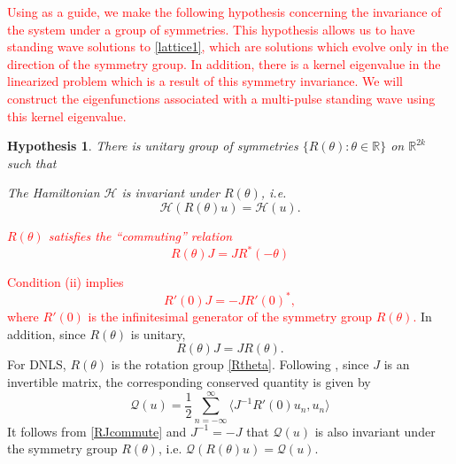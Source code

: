 \documentclass[12pt]{elsarticle}
\def\R{{\mathbb R}}
\newtheorem{hypothesis}{Hypothesis}
\newcommand{\revised}[1]{ \textcolor{red}{#1} }
\begin{document}
\revised{Using \cite{Grillakis1987} as a guide, we make the following hypothesis concerning the invariance of the system under a group of symmetries. This hypothesis allows us to have standing wave solutions to \eqref{lattice1}, which are solutions which evolve only in the direction of the symmetry group. In addition, there is a kernel eigenvalue in the linearized problem which is a result of this symmetry invariance. We will construct the eigenfunctions associated with a multi-pulse standing wave using this kernel eigenvalue.}
\begin{hypothesis}\label{symmetryhyp}
There is unitary group of symmetries $\{ R(\theta) : \theta \in \R \}$ on $\R^{2k}$ such that 
\begin{enumerate}[(i)]
\item The Hamiltonian $\mathcal{H}$ is invariant under $R(\theta)$, i.e. 
\begin{equation}\label{Hinvariance}
\mathcal{H}(R(\theta)u) = \mathcal{H}(u).
\end{equation}

\revised{
\item $R(\theta)$ satisfies the ``commuting'' relation
\begin{equation}\label{RJcommute}
R(\theta) J = J R^*(-\theta)
\end{equation}
}
\end{enumerate}
\end{hypothesis}
\revised{
\noindent Condition (ii) implies 
\begin{equation}\label{RprimeJcommute}
R'(0) J = -J R'(0)^*,
\end{equation}
where $R'(0)$ is the infinitesimal generator of the symmetry group $R(\theta)$. } In addition, since $R(\theta)$ is unitary,
\begin{equation}\label{RJcommute2}
R(\theta) J = J R(\theta).
\end{equation}
For DNLS, $R(\theta)$ is the rotation group \cref{Rtheta}. Following \cite[(2.9)]{Grillakis1987}, since $J$ is an invertible matrix, the corresponding conserved quantity is given by
\begin{equation}\label{genQ}
\mathcal{Q}(u) = \frac{1}{2} \sum_{n = -\infty}^\infty 
\langle J^{-1}R'(0) u_n, u_n \rangle
\end{equation}
It follows from \eqref{RJcommute} and $J^{-1} = -J$ that $\mathcal{Q}(u)$ is also invariant under the symmetry group $R(\theta)$, i.e. $\mathcal{Q}(R(\theta)u) = \mathcal{Q}(u)$.
\end{document}
